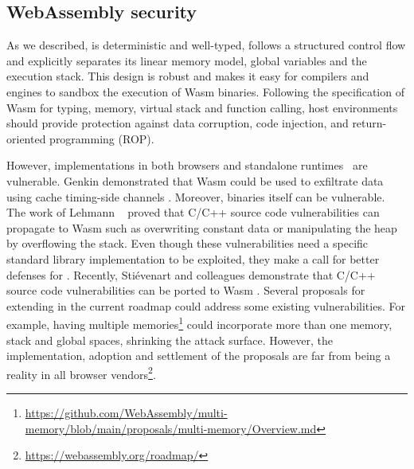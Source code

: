 







\subsection{WebAssembly security}

As we described, \wasm is deterministic and well-typed, follows a structured control flow and explicitly separates its linear memory model, global variables and the execution stack. This design is robust \cite{WebAssemblySecurity} and makes it easy for compilers and engines to sandbox the execution of Wasm  binaries. Following the specification of Wasm  for typing, memory, virtual stack and function calling,
host environments should provide protection against data corruption, code injection, and return-oriented programming (ROP).

However, implementations in both browsers and standalone runtimes~\cite{Narayan2021Swivel} are vulnerable.
Genkin \etal demonstrated that Wasm  could be used to exfiltrate data using cache timing-side channels \cite{Genkin2018DrivebyKC}.
Moreover, binaries itself can be vulnerable. The work of Lehmann \etal ~\cite{usenixWasm2020} proved that C/C++ source code vulnerabilities can propagate to Wasm  such as overwriting constant data or manipulating the heap by overflowing the stack. Even though these vulnerabilities need a specific standard library implementation to be exploited, they make a call for better defenses for \wasm. 
Recently, Stiévenart and colleagues demonstrate that C/C++ source code vulnerabilities can be ported to Wasm \cite{DeRoover2022}.
Several proposals for extending \wasm in the current roadmap could address some existing vulnerabilities. For example, having multiple memories\footnote{\url{https://github.com/WebAssembly/multi-memory/blob/main/proposals/multi-memory/Overview.md}} could incorporate more than one memory, stack and global spaces, shrinking the attack surface. However, the implementation, adoption and settlement of the proposals are far from being a reality in all browser vendors\footnote{\url{https://webassembly.org/roadmap/}}. 
